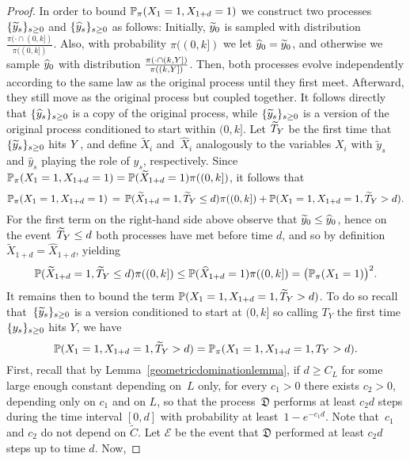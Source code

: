 \begin{proof}
In order to bound $\P_{\pi}(X_1=1, X_{1+d}=1)$ we construct two processes $\{\widetilde{\auxy}_s\}_{s\geq0}$ and $\{\widehat{\auxy}_s\}_{s\geq0}$ as follows: Initially, $\widetilde{\auxy}_0$ is sampled with 
    distribution $\frac{\pi(\cdot\cap(0,k])}{\pi((0,k])}$.
    Also, with probability $\pi((0,k])$ we let $\widehat{\auxy}_0=\widetilde{\auxy}_0$, and otherwise we sample $\widehat{\auxy}_0$ with distribution  $\frac{\pi(\cdot\cap(k,\auxY])}{\pi((k,\auxY])}$.
    Then, both processes evolve independently according to the same law as the original process until they first meet. Afterward, they still move as the original process but coupled together.
It follows directly that $\{\widehat{\auxy}_s\}_{s \ge 0}$ is a copy of the original process, while $\{\widetilde{\auxy}_s\}_{s \ge 0}$ is a version of the original process conditioned to start within $(0,k]$. Let $\widetilde{T}_{\auxY}$ be the first time that $\{\widetilde{\auxy}_s\}_{s \ge 0}$ hits $\auxY$, and define $\widetilde{X}_i$ and~$\widehat{X}_i$ analogously to the variables $X_i$ with $\widetilde{y}_s$ and $\widehat{y}_s$ playing the role of $y_s$, respectively. Since $\P_{\pi}(X_1=1, X_{1+d}=1)=\P(\widetilde{X}_{1+d}=1)\pi((0,k])$,
it follows that 
\[\P_{\pi}(X_1=1, X_{1+d}=1)\,=\,\P(\widetilde{X}_{1+d}=1, \widetilde{T}_Y
\leq d)\pi((0,k])+\P(X_1=1, X_{1+d}=1,\widetilde{T}_Y>d).
\]
For the first term on the right-hand side above observe that $\widetilde{\auxy}_0\leq \widehat{\auxy}_0$, hence on the event~$\widetilde{T}_{\auxY}\leq d$ both processes have met before time $d$, and so by definition $\widetilde{X}_{1+d}=\widehat{X}_{1+d}$, yielding
\[
\P(\widetilde{X}_{1+d}=1, \widetilde{T}_Y\leq d)\pi((0,k])\leq \P(\widehat{X}_{1+d}=1)\pi((0,k])=\big(\P_{\pi}(X_1=1)\big)^2.
\]
It remains then to bound the term $\P(X_1=1, X_{1+d}=1,\widetilde{T}_Y>d)$. To do so recall that~$\{\widetilde{\auxy}_s\}_{s \ge 0}$ is a version conditioned to start at $(0,k]$ so calling $T_Y$ the first time $\{\auxy_s\}_{s\ge0}$ hits $Y$, we have
\[\P(X_1=1, X_{1+d}=1,\widetilde{T}_Y>d)=\P_{\pi}(X_{1}=1, X_{1+d}=1, T_Y
>d).\]
First, recall that by Lemma~\ref{geometricdominationlemma}, if $d\ge C_L$ for some large enough constant depending on~$L$ only, for every $c_1 > 0$ there exists $c_2 > 0$, depending only on $c_1$ and on $L$, so that the process~$\mathfrak{D}$ performs at least $c_2 d$ steps during the time interval $[0, d]$  with probability at least~$1-e^{-c_1d}$. Note that~$c_1$ and $c_2$ do not depend on $\widetilde{C}$. Let $\mathcal{E}$ be the event that $\mathfrak{D}$ performed at least $c_2 d$ steps up to time $d$. Now, 

\end{proof}
